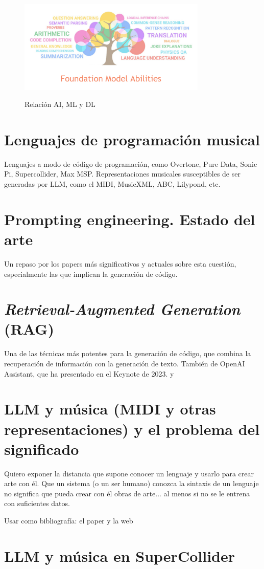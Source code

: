     \begin{figure}[h]
        \caption{Relación AI, ML y DL}
        \centering
        \includegraphics[width=0.8\textwidth]{./figuras/fundation_models_habilities.png}
        \label{fig:fundation_models_habilities}
    \end{figure}

\section{Lenguajes de programación musical}
    Lenguajes a modo de código de programación, como Overtone, Pure Data, Sonic Pi, Supercollider, Max MSP. Representaciones musicales susceptibles de ser generadas por LLM, como el MIDI, MusicXML, ABC, Lilypond, etc.

\section{Prompting engineering. Estado del arte}
    Un repaso por los papers más significativos y actuales sobre esta cuestión, especialmente las que implican la generación de código.

\section{\textit{Retrieval-Augmented Generation} (RAG)}
    Una de las técnicas más potentes para la generación de código, que combina la recuperación de información con la generación de texto. También de OpenAI Assistant, que ha presentado en el Keynote de 2023. \cite{WhatRetrievalaugmentedGeneration2021} y \cite{lewisRetrievalAugmentedGenerationKnowledgeIntensive2021}

\section{LLM y música (MIDI y otras representaciones) y el problema del significado}
    Quiero exponer la distancia que supone conocer un lenguaje y usarlo para crear arte con él. Que un sistema (o un ser humano) conozca la sintaxis de un lenguaje no significa que pueda crear con él obras de arte... al menos si no se le entrena con suficientes datos.
    
    Usar como bibliografía: el paper \cite{lewisRetrievalAugmentedGenerationKnowledgeIntensive2021} y la web \cite{WhatRetrievalaugmentedGeneration2021}

\section{LLM y música en SuperCollider}